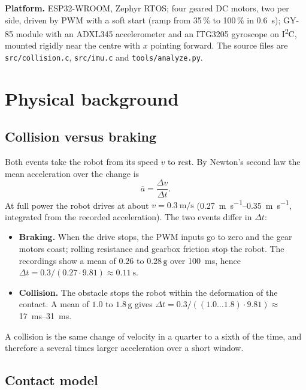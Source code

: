 \documentclass[11pt,a4paper]{article}
\newcommand{\g}{\,\mathrm{g}}
\newcommand{\code}[1]{\texttt{#1}}
\begin{document}
\textbf{Platform.} ESP32-WROOM, Zephyr RTOS; four geared DC motors, two per side, driven by PWM
with a soft start (ramp from 35\,\% to 100\,\% in \SI{0.6}{\second}); GY-85 module with an
ADXL345 accelerometer and an ITG3205 gyroscope on I\textsuperscript{2}C, mounted rigidly near
the centre with $x$ pointing forward. The source files are \code{src/collision.c},
\code{src/imu.c} and \code{tools/analyze.py}.

\section{Physical background}

\subsection{Collision versus braking}

Both events take the robot from its speed $v$ to rest. By Newton's second law the mean
acceleration over the change is
\begin{equation}
  \bar a = \frac{\Delta v}{\Delta t}.
\end{equation}
At full power the robot drives at about $v = \SI{0.3}{\metre\per\second}$
(\SIrange{0.27}{0.35}{\metre\per\second}, integrated from the recorded acceleration). The two
events differ in $\Delta t$:
\begin{itemize}
  \item \textbf{Braking.} When the drive stops, the PWM inputs go to zero and the gear motors
    coast; rolling resistance and gearbox friction stop the robot. The recordings show a mean of
    $0.26$ to $0.28\g$ over \SI{100}{\milli\second}, hence
    $\Delta t = 0.3 / (0.27 \cdot 9.81) \approx \SI{0.11}{\second}$.
  \item \textbf{Collision.} The obstacle stops the robot within the deformation of the contact.
    A mean of $1.0$ to $1.8\g$ gives $\Delta t = 0.3 / ((1.0\ldots1.8) \cdot 9.81) \approx$
    \SIrange{17}{31}{\milli\second}.
\end{itemize}
A collision is the same change of velocity in a quarter to a sixth of the time, and therefore a
several times larger acceleration over a short window.

\subsection{Contact model}
\end{document}
